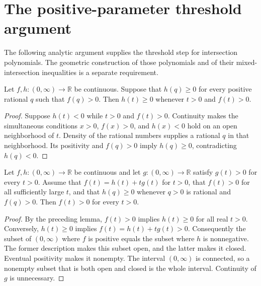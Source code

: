 \section{The positive-parameter threshold argument}

The following analytic argument supplies the threshold step for intersection
polynomials. The geometric construction of those polynomials and of their
mixed-intersection inequalities is a separate requirement.

\begin{lemma}
\label{lem:nef-ample-rational-threshold-tests}
\leanok
Let $f,h:(0,\infty)\to\mathbb R$ be continuous. Suppose that
$h(q)\geq0$ for every positive rational $q$ such that $f(q)>0$.
Then $h(t)\geq0$ whenever $t>0$ and $f(t)>0$.
\end{lemma}
\begin{proof}
Suppose $h(t)<0$ while $t>0$ and $f(t)>0$. Continuity makes the
simultaneous conditions $x>0$, $f(x)>0$, and $h(x)<0$ hold on an open
neighborhood of $t$. Density of the rational numbers supplies a rational
$q$ in that neighborhood. Its positivity and $f(q)>0$ imply $h(q)\geq0$,
contradicting $h(q)<0$.
\end{proof}

\begin{theorem}
\label{thm:nef-ample-no-positive-threshold}
\leanok
{}
Let $f,h:(0,\infty)\to\mathbb R$ be continuous and let
$g:(0,\infty)\to\mathbb R$ satisfy $g(t)>0$ for every $t>0$.
Assume that $f(t)=h(t)+t g(t)$ for $t>0$, that $f(t)>0$ for all
sufficiently large $t$, and that $h(q)\geq0$ whenever $q>0$ is rational
and $f(q)>0$. Then $f(t)>0$ for every $t>0$.
\end{theorem}
\begin{proof}
By the preceding lemma, $f(t)>0$ implies $h(t)\geq0$ for all real
$t>0$. Conversely, $h(t)\geq0$ implies
$f(t)=h(t)+t g(t)>0$. Consequently the subset of $(0,\infty)$ where
$f$ is positive equals the subset where $h$ is nonnegative. The former
description makes this subset open, and the latter makes it closed.
Eventual positivity makes it nonempty. The interval $(0,\infty)$ is
connected, so a nonempty subset that is both open and closed is the whole
interval. Continuity of $g$ is unnecessary.
\end{proof}
